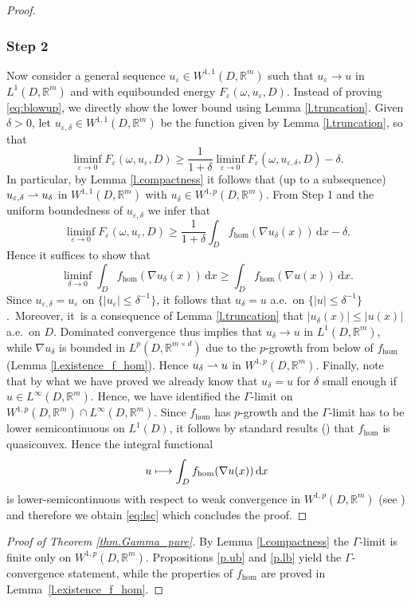 \documentclass[10pt]{amsart}
\def\mto{\mathchoice{\longmapsto}{\mapsto}{\mapsto}{\mapsto}}
\def\harptod{\mathrel{\relbar\joinrel\rightharpoonup}}
\def\harpto{\mathchoice{\harptod}{\rightharpoonup}{\rightharpoonup}{\rightharpoonup}}
\theoremstyle{definition}
\let\e\varepsilon
\let\w\omega
\newcommand{\dx}{\,\mathrm{d}x}
\newcommand{\R}{\mathbb{R}}
\begin{document}
\begin{proof}
\subsubsection*{Step 2} Now consider a general sequence $u_{\e}\in W^{1,1}(D,\R^m)$ such that $u_{\e}\to u$ in $L^1(D,\R^m)$ and with equibounded energy $F_{\e}(\w,u_{\e},D)$. Instead of proving \eqref{eq:blowup}, we directly show the lower bound using Lemma \ref{l.truncation}. Given $\delta>0$, let $u_{\e,\delta}\in W^{1,1}(D,\R^m)$ be the function given by Lemma \ref{l.truncation}, so that
\begin{equation*}
\liminf_{\e\to 0}F_{\e}(\w,u_{\e},D)\geq \frac{1}{1+\delta}\liminf_{\e\to 0}F_{\e}(\w,u_{\e,\delta},D)-\delta.
\end{equation*}
In particular, by Lemma \ref{l.compactness} it follows that (up to a subsequence) $u_{\e,\delta}\harpto u_{\delta}$ in $W^{1,1}(D,\R^m)$ with $u_{\delta}\in W^{1,p}(D,\R^m)$. From Step 1 and the uniform boundedness of $u_{\e,\delta}$ we infer that
\begin{equation*}
\liminf_{\e\to 0}F_{\e}(\w,u_{\e},D)\geq \frac{1}{1+\delta}\int_Df_{\hom}(\nabla u_{\delta}(x))\dx-\delta.
\end{equation*}
Hence it suffices to show that
\begin{equation}\label{eq:lsc}
\liminf_{\delta\to 0}\int_D f_{\hom}(\nabla u_{\delta}(x))\dx\geq \int_D f_{\hom}(\nabla u(x))\dx.
\end{equation}
Since $u_{\e,\delta}=u_{\e}$ on $\{|u_{\e}|\leq\delta^{-1}\}$, it follows that $u_{\delta}=u$ a.e.\ on $\{|u|\leq \delta^{-1}\}$.~Moreover, it~is a consequence of Lemma \ref{l.truncation} that $|u_{\delta}(x)|\leq |u(x)|$ a.e.\ on $D$. Dominated convergence thus implies that $u_{\delta}\to u$ in $L^1(D,\R^m)$, while $\nabla u_{\delta}$ is bounded in $L^p(D,\R^{m\times d})$ due to the $p$-growth from below of $f_{\hom}$ (\cf Lemma \ref{l.existence_f_hom}). Hence $u_{\delta}\harpto u$ in $W^{1,p}(D,\R^m)$. Finally, note that by what we have proved we already know that $u_{\delta}=u$ for $\delta$ small enough if $u\in L^{\infty}(D,\R^m)$. Hence, we have identified the $\Gamma$-limit on $W^{1,p}(D,\R^m)\cap L^{\infty}(D,\R^m)$. Since $f_{\hom}$ has $p$-growth and the $\Gamma$-limit has to be lower semicontinuous on $L^1(D)$, it follows by standard results (\cite[Th.\,8.4]{Da}) that $f_{\hom}$ is quasiconvex. Hence the integral functional
\begin{equation*}
u\mto \int_D f_{\hom}(\nabla u(x))\dx
\end{equation*}
is lower-semicontinuous with respect to weak convergence in $W^{1,p}(D,\R^m)$ (see \cite[Th.\,8.11]{Da}) and therefore we obtain \eqref{eq:lsc} which concludes the proof.
\end{proof}
\begin{proof}[Proof of Theorem \ref{thm.Gamma_pure}]
By Lemma \ref{l.compactness} the $\Gamma$-limit is finite only on $W^{1,p}(D,\R^m)$. Propositions \ref{p.ub} and \ref{p.lb} yield the $\Gamma$-convergence statement, while the properties of $f_{\hom}$ are proved in Lemma~\ref{l.existence_f_hom}.
\end{proof}
\end{document}
